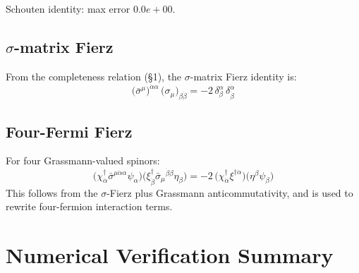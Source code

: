 \documentclass[12pt]{article}
\newcommand{\verified}[1]{\textcolor{verifygreen}{\checkmark\; #1}}
\begin{document}
\verified{Schouten identity: max error $0.0e+00$.}

\subsection{$\sigma$-matrix Fierz}

From the completeness relation (§1), the $\sigma$-matrix Fierz identity is:
\begin{equation}
  \bigl(\bar\sigma^\mu\bigr)^{\dot\alpha\alpha}\,\bigl(\sigma_\mu\bigr)_{\beta\dot\beta}
  = -2\,\delta^\alpha_\beta\,\delta^{\dot\alpha}_{\dot\beta}
  \tag{38.18}
\end{equation}

\subsection{Four-Fermi Fierz}

For four Grassmann-valued spinors:
\begin{equation}
  \bigl(\chi^\dagger_{\dot\alpha}\bar\sigma^{\mu\dot\alpha\alpha}\psi_\alpha\bigr)
  \bigl(\xi^\dagger_{\dot\beta}\bar\sigma_\mu{}^{\dot\beta\beta}\eta_\beta\bigr)
  = -2\,\bigl(\chi^\dagger_{\dot\alpha}\xi^{\dagger\dot\alpha}\bigr)
         \bigl(\eta^\beta\psi_\beta\bigr)
  \tag{38.21}
\end{equation}
This follows from the $\sigma$-Fierz plus Grassmann anticommutativity,
and is used to rewrite four-fermion interaction terms.

\section{Numerical Verification Summary}
\end{document}
